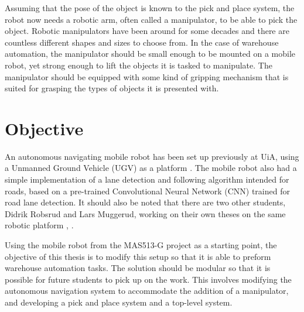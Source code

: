 Assuming that the pose of the object is known to the pick and place system, the robot now needs a robotic arm, often called a manipulator, to be able to pick the object. Robotic manipulators have been around for some decades and there are countless different shapes and sizes to choose from. In the case of warehouse automation, the manipulator should be small enough to be mounted on a mobile robot, yet strong enough to lift the objects it is tasked to manipulate. The manipulator should be equipped with some kind of gripping mechanism that is suited for grasping the types of objects it is presented with.


\section{Objective} \label{sec:I:Objective}
An autonomous navigating mobile robot has been set up previously at UiA, using a Unmanned Ground Vehicle (UGV) as a platform \cite{MAS513Rep}. The mobile robot also had a simple implementation of a lane detection and following algorithm intended for roads, based on a pre-trained Convolutional Neural Network (CNN) trained for road lane detection. It should also be noted that there are two other students, Didrik Robsrud and Lars Muggerud, working on their own theses on the same robotic platform \cite{robsrud2023}, \cite{muggerud2023}. 

Using the mobile robot from the MAS513-G project as a starting point, the objective of this thesis is to modify this setup so that it is able to preform warehouse automation tasks. The solution should be modular so that it is possible for future students to pick up on the work. This involves modifying the autonomous navigation system to accommodate the addition of a manipulator, and developing a pick and place system and a top-level system.

